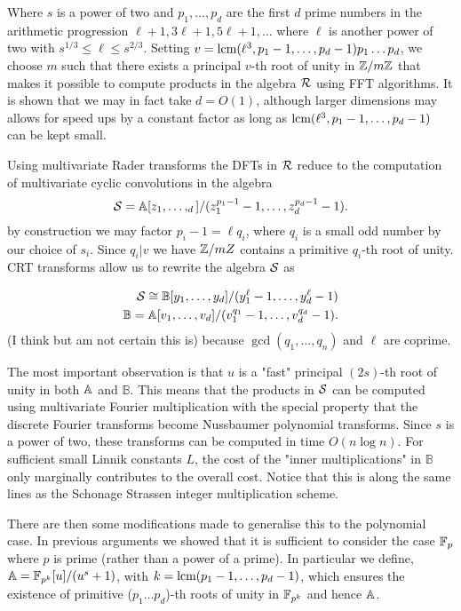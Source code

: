 Where $s$ is a power of two and $p_1, \ldots, p_d$ are the first $d$ prime numbers in the arithmetic progression $\ell + 1, 3\ell + 1, 5\ell + 1, \ldots$ where $\ell$ is another power of two with $s^{1/3} \leq \ell \leq s^{2/3}$.  Setting $v = \textrm{lcm}(\ell^3, p_1 - 1, \ldots, p_d - 1)p_1\dots p_d$, we choose $m$ such that there exists a principal $v$-th root of unity in ${\mathbb Z}/m{\mathbb Z}$ that makes it possible to compute products in the algebra $\mathcal R$ using FFT algorithms. It is shown that we may in fact take $d = O(1)$, although larger dimensions may allows for speed ups by a constant factor as long as $\textrm{lcm}(\ell^3, p_1 - 1, \ldots, p_d - 1)$ can be kept small.

Using multivariate Rader transforms the DFTs in $\mathcal R$ reduce to the computation of multivariate cyclic convolutions in the algebra
\[
    \mathcal S = {\mathbb A}[z_1, \ldots, _d] / (z_1^{p_1 - 1} - 1, \ldots, z_d^{p_d - 1} - 1).
\]
by construction we may factor $p_i - 1 = \ell q_i$, where $q_i$ is a small odd number by our choice of $s_i$. Since $q_i | v$ we have ${\mathbb Z} /mZ$ contains a primitive $q_i$-th root of unity. CRT transforms allow us to rewrite the algebra $\mathcal S$ as

\begin{align*}
    \mathcal S \cong \mathbb{B}[y_1, \ldots, y_d]/(y_1^\ell - 1, \ldots, y_d^\ell - 1)\\
    \mathbb{B} = \mathbb{A}[v_1, \ldots, v_d] / (v_1^{q_1} - 1, \ldots, v_d^{q_d} - 1).
\end{align*}
(I think but am not certain this is) because $\gcd(q_1, \ldots, q_n)$ and $\ell$ are coprime.

The most important observation is that $u$ is a "fast" principal $(2s)$-th root of unity in both ${\mathbb A}$ and $\mathbb{B}$. This means that the products in $\mathcal S$ can be computed using multivariate Fourier multiplication with the special property that the discrete Fourier transforms become Nussbaumer polynomial transforms. Since $s$ is a power of two, these transforms can be computed in time $O(n \log n)$. For sufficient small Linnik constants $L$, the cost of the "inner multiplications" in $\mathbb{B}$ only marginally contributes to the overall cost. Notice that this is along the same lines as the Schonage Strassen integer multiplication scheme.

There are then some modifications made to generalise this to the polynomial case. In previous arguments we showed that it is sufficient to consider the case ${\mathbb F}_p$ where $p$ is prime (rather than a power of a prime). In particular we define, ${\mathbb A} = {\mathbb F}_{p^k}[u] / (u^s + 1)$, with $k = \textrm{lcm}(p_1 - 1, \ldots, p_d - 1)$, which ensures the existence of primitive ($p_1 \ldots p_d$)-th roots of unity in ${\mathbb F}_{p^k}$ and hence ${\mathbb A}$.

